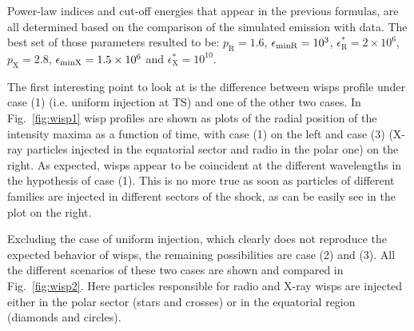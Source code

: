 Power-law indices and cut-off energies that appear in the previous formulas, are all determined based on the comparison of the simulated emission with data. The best set of those parameters resulted to be: $p_\mathrm{R}=1.6$, $\epsilon_{\rm minR}=10^3$, $\epsilon_\mathrm{R}^*=2 \times10^6$, $p_\mathrm{X}=2.8$, $\epsilon_{\rm minX}=1.5 \times 10^6$ and $\epsilon_\mathrm{X}^*=10^{10}$.



The first interesting point to look at is the difference between wisps profile under case (1) (i.e. uniform injection at TS) and one of the other two cases. In Fig.~\ref{fig:wisp1} wisp profiles are shown as plots of the radial position of the intensity maxima as a function of time, with case (1) on the left and case (3) (X-ray particles injected in the equatorial sector and radio in the polar one) on the right.
As expected, wisps appear to be coincident at the different wavelengths in the hypothesis of case (1). 
This is no more true as soon as particles of different families are injected in different sectors of the shock, as can be easily see in the plot on the right.


Excluding the case of uniform injection, which clearly does not reproduce the expected behavior of wisps, the remaining  possibilities are case (2) and (3). 
All the different scenarios of these two cases are shown and compared in Fig.~\ref{fig:wisp2}. 
Here particles responsible for radio and X-ray wisps are injected either in the polar sector (stars and crosses) or in the equatorial region (diamonds and circles).


